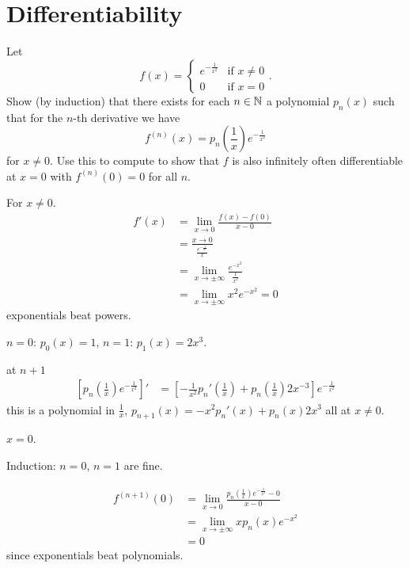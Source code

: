 \documentclass[10pt, a4paper]{article}
\begin{document}
\section{Differentiability}

\begin{example}
    Let
    \[
    f(x) = \begin{cases}
        e ^ {-\frac{1}{x ^ 2}} & \text{if } x \neq 0 \\
        0 & \text{if } x = 0
    \end{cases}.
    \]
    Show
    (by induction)
    that there exists for each $n \in \mathbb{N}$ a polynomial $p_n(x)$ such that for the $n$-th derivative we have
    \[
    f ^ {(n)}(x) = p_n\left(\frac{1}{x}\right)e ^ {-\frac{1}{x ^ 2}}
    \]
    for $x \neq 0$.
    Use this to compute to show that $f$ is also infinitely often differentiable at $x = 0$ with $f ^ {(n)}(0) = 0$ for all $n$.

    \begin{solution}
        For $x \neq 0$.
        \begin{align*}
            f'(x) &= \lim_{x \rightarrow 0}\frac{f(x) - f(0)}{x - 0} \\
            &= \frac{x \rightarrow 0}{\frac{e ^ {-\frac{1}{x ^ 2}}}{x}} \\
            &= \lim_{x \rightarrow \pm\infty}\frac{e ^ {-x ^ 2}}{\frac{1}{x ^ 2}} \\
            &= \lim_{x \rightarrow \pm\infty}x ^ 2e ^ {-x ^ 2} = 0
        \end{align*}
        exponentials beat powers.

        $n = 0$:
        $p_0(x) = 1$,
        $n = 1$:
        $p_1(x) = 2x ^ 3$.

        at $n + 1$
        \begin{align*}
            \left[p_n\left(\frac{1}{x}\right)e ^ {-\frac{1}{x ^ 2}}\right]' &= \left[-\frac{1}{x ^ 2}p_n'\left(\frac{1}{x}\right) + p_n\left(\frac{1}{x}\right)2x ^ {-3}\right]e ^ {-\frac{1}{x ^ 2}}
        \end{align*}
        this is a polynomial in $\frac{1}{x}$,
        $p_{n + 1}(x) = -x ^ 2p_n'(x) + p_n(x)2x ^ 3$
        all at $x \neq 0$.

        $x = 0$.

        Induction:
        $n = 0$,
        $n = 1$ are fine.

        \begin{align*}
            f ^ {(n + 1)}(0) &= \lim_{x \rightarrow 0}\frac{p_n\left(\frac{1}{x}\right)e ^ {-\frac{1}{x ^ 2}} - 0}{x - 0} \\
            &= \lim_{x \rightarrow \pm\infty}xp_n(x)e ^ {-x ^ 2} \\
            &= 0
        \end{align*}
        since exponentials beat polynomials.
    \end{solution}
\end{example}
\end{document}
